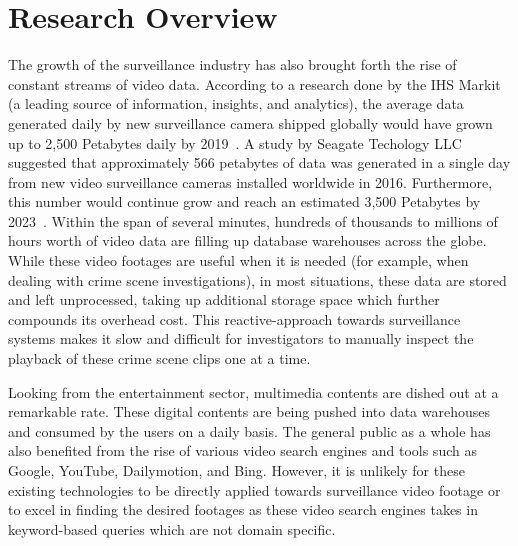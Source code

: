 \section{Research Overview}
\label{section:introduction}

The growth of the surveillance industry has also brought forth the rise of
constant streams of video data. According to a research done by the IHS Markit
(a leading source of information, insights, and analytics), the average data
generated daily by new surveillance camera shipped globally would have grown up to 2,500 Petabytes daily by 2019~\cite{woodhouse2016big}. 
A study by Seagate Techology LLC suggested that approximately 566 petabytes of data was generated in a single day from new video surveillance cameras installed worldwide in 2016. Furthermore, this number would continue grow and reach an estimated 3,500 Petabytes by 2023~\cite{mrfr_2021}.
Within the span of several minutes, hundreds of thousands %
to millions of hours worth of video data are filling up database warehouses across the globe.
While these video footages are useful when it is needed (for example, when
dealing with crime scene investigations), in most situations, these data are stored and left unprocessed, taking up additional storage space which further compounds its overhead cost.
This reactive-approach towards surveillance systems makes it slow and difficult for investigators to manually inspect the playback of these crime scene clips one at a time.

Looking from the entertainment sector, multimedia contents are dished out at a
remarkable rate. These digital contents are being pushed into data warehouses
and consumed by the users on a daily basis. The general public as a whole has
also benefited from the rise of various video search engines and tools such as
Google, YouTube, Dailymotion, and Bing. However, it is unlikely for these
existing technologies to be directly applied towards surveillance video footage
or to excel in finding the desired footages as these video search engines takes
in keyword-based queries which are not domain specific.

